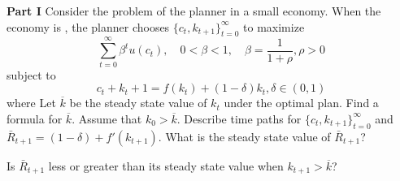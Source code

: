 \medskip
{}
 \medskip\noindent
{\bf Part  I}
\medskip \noindent
Consider the problem of the planner in a small economy. When the economy is , the planner chooses $\{c_t,k_{t+1}\}_{t=0}^\infty$ to maximize
$$ \sum_{t=0}^\infty \beta^t u(c_t), \quad  0< \beta<1, \quad  \beta = {{\frac{1}{1+\rho}}}, \rho>0$$
subject to
$$c_t+k_t+1=f(k_t)+(1-\delta)k_t,  \delta \in (0,1)$$
\noindent where%
\medskip
\noindent
Let $\overline{k}$ be the steady state value of $k_t$ under the optimal plan.
\medskip
{} Find a formula for $\overline{k}$.
\medskip
{} Assume that $k_0 > \overline{k}$. Describe time paths for $\{c_t,k_{t+1}\}_{t=0}^\infty$ and $\bar R_{t+1}=(1-\delta) + f'(k_{t+1})$.
\medskip
{} What is the steady state value of $\bar R_{t+1}$?\medskip

 Is $\bar R_{t+1}$ less or greater than its steady state value when $k_{t+1} > \overline{k}$?

